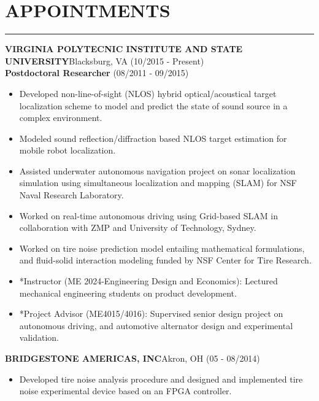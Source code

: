 \documentclass[12pt,letterpaper]{article}
\begin{document}
\section*{APPOINTMENTS}
\vspace{-2mm}
\hrule
\MakeUppercase{\bf Virginia Polytecnic Institute and State University}\hfill{Blacksburg, VA }{(10/2015 - Present)}\\
{\bfseries Postdoctoral Researcher}
\hspace{5mm}{\bfseries Graduate Research Assistant/ *Graduate Teaching Assistant}\hfill {(08/2011 - 09/2015)}\\
\begin{itemize}
\item Developed non-line-of-sight (NLOS) hybrid optical/acoustical target localization scheme to model and predict the state of sound source in a complex environment.
\item Modeled sound reflection/diffraction based NLOS target estimation for mobile robot localization.
\item Assisted underwater autonomous navigation project on sonar localization simulation using simultaneous localization and mapping (SLAM) for NSF Naval Research Laboratory.
\item Worked on real-time autonomous driving using Grid-based SLAM in collaboration with ZMP and University of Technology, Sydney.
\item Worked on tire noise prediction model entailing mathematical formulations, and fluid-solid interaction modeling funded by NSF Center for Tire Research.
\item *Instructor (ME 2024-Engineering Design and Economics): Lectured mechanical engineering students on product development.
\item *Project Advisor (ME4015/4016): Supervised senior design project on autonomous driving, and automotive alternator design and experimental validation. 
\end{itemize}

\MakeUppercase{\bf Bridgestone Americas, Inc}\hfill{Akron, OH}{ (05 - 08/2014)}\\
\hspace{5mm}{\bf Advanced Tire Technology - Research intern}
\begin{itemize}
\item Developed tire noise analysis procedure and designed and implemented tire noise experimental device based on an FPGA controller.
\end{itemize}
\end{document}
